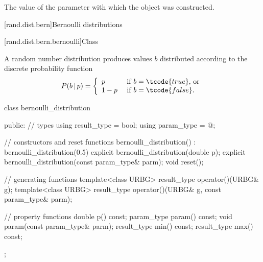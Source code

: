 \begin{itemdescr}
\pnum\returns The value of the  parameter
 with which the object was constructed.
\end{itemdescr}%
%



[rand.dist.bern]{Bernoulli distributions}%
%
%


[rand.dist.bern.bernoulli]{Class }%
%
%

\pnum
A  random number distribution
produces  values $b$
distributed according to
the discrete probability function
%
%
\[  P(b\,|\,p) = \left\{ \begin{array}{ll}
                          p     & \text{ if $b = \tcode{true}$, or} \\
                          1 - p & \text{ if $b = \tcode{false}$.}
                          \end{array}\right.
\]

%
\begin{codeblock}
class bernoulli_distribution {
public:
  // types
  using result_type = bool;
  using param_type  = @\unspec@;

  // constructors and reset functions
  bernoulli_distribution() : bernoulli_distribution(0.5) {}
  explicit bernoulli_distribution(double p);
  explicit bernoulli_distribution(const param_type& parm);
  void reset();

  // generating functions
  template<class URBG>
    result_type operator()(URBG& g);
  template<class URBG>
    result_type operator()(URBG& g, const param_type& parm);

  // property functions
  double p() const;
  param_type param() const;
  void param(const param_type& parm);
  result_type min() const;
  result_type max() const;
};
\end{codeblock}


